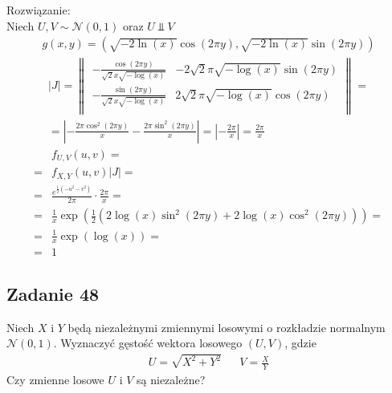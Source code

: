 Rozwiązanie:\\
Niech $ U,V\sim \mathcal N(0,1) $ oraz $ U\Perp V $
\begin{gather*}
g(x,y)=\left(\sqrt{-2\ln(x)}\cos(2\pi y),\sqrt{-2\ln(x)}\sin(2\pi y)\right)
\end{gather*}
\begin{gather*}
|J|=\begin{Vmatrix}
 -\frac{\cos (2 \pi  y)}{\sqrt{2} x \sqrt{-\log (x)}} & -2 \sqrt{2} \pi 
   \sqrt{-\log (x)} \sin (2 \pi  y) \\
 -\frac{\sin (2 \pi  y)}{\sqrt{2} x \sqrt{-\log (x)}} & 2 \sqrt{2} \pi 
   \sqrt{-\log (x)} \cos (2 \pi  y) \\
\end{Vmatrix}
=\\=
\left|-\frac{2 \pi  \cos ^2(2 \pi  y)}{x}-\frac{2 \pi  \sin ^2(2 \pi  y)}{x}\right|
=
\left|-\frac{2 \pi }{x}\right|=\frac{2 \pi }{x}
\end{gather*}
\begin{align*}
&f_{U,V}(u,v)
=\\=&
f_{X,Y}(u,v)|J|
=\\=&
\frac{e^{\frac{1}{2} \left(-u^2-v^2\right)}}{2 \pi }\cdot\frac{2 \pi }{x}
=\\=&
\frac{1}{x}\exp \left(\frac{1}{2} \left(2 \log (x) \sin ^2(2 \pi  y)+2 \log (x) \cos^2(2 \pi  y)\right)\right)
=\\=&
\frac{1}{x}\exp \left(\log (x)\right)
=\\=&
1
\end{align*}


\subsection*{Zadanie 48}
Niech $ X $ i $ Y $ będą niezależnymi zmiennymi losowymi o rozkładzie normalnym $ \mathcal N(0,1) $. Wyznaczyć gęstość wektora losowego $ (U,V) $, gdzie
\begin{align*}
U=\sqrt{X^2+Y^2}
&&
V=\frac{X}{Y}
\end{align*}
Czy zmienne losowe $ U $ i $ V $ są niezależne?

